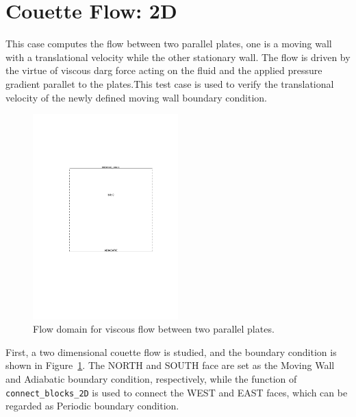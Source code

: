 
\newpage
\section{Couette Flow: 2D}
\label{couette-flow-2D}
%
This case computes the flow between two parallel plates,
one is a moving wall with a translational velocity while the other stationary wall.
The flow is driven by the virtue of viscous darg force acting on the fluid and the applied
pressure gradient parallet to the plates.This test case is used to verify the translational
velocity of the newly defined moving wall boundary condition.

\begin{figure}[htbp]
\begin{center}
\includegraphics[width=0.5\textwidth,viewport=139 274 503 629,clip=true]{../2D/couette-flow/couette.pdf}
\end{center}
\caption{Flow domain for viscous flow between two parallel plates.}
   \label{couette-layout-fig}
\end{figure}

\medskip
First, a two dimensional couette flow is studied, and the boundary condition is shown in Figure~\ref{couette-layout-fig}.
The NORTH and SOUTH face are set as the Moving Wall and Adiabatic boundary condition, respectively, while the function of 
\texttt{connect\_blocks\_2D} is used to connect the WEST and EAST faces, which can be regarded as
Periodic boundary condition.

